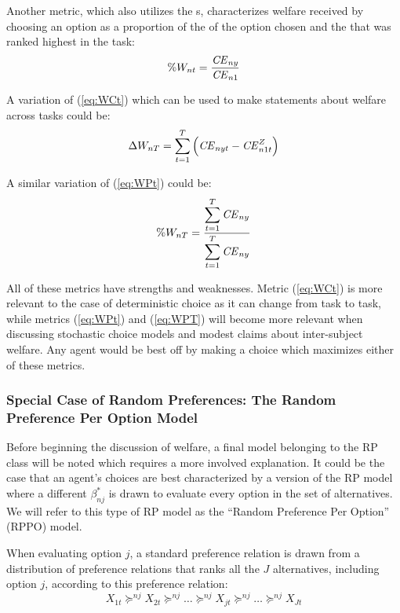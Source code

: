Another metric, which also utilizes the {\CE}s, characterizes welfare received by choosing an option as a proportion of the {\CE} of the option chosen and the {\CE} that was ranked highest in the task:
\begin{equation}
	\label{eq:WPt}
	\%W_{nt} = \frac{ {\mathit{CE}}_{ny} }{ {\mathit{CE}}_{n1} }
\end{equation}

\noindent A variation of (\ref{eq:WCt}) which can be used to make statements about welfare across tasks could be:
\begin{equation}
	\label{eq:WCT}
	\Delta W_{nT} = \sum_{t=1}^T \left( {\mathit{CE}}_{nyt} - {\mathit{CE}}_{n1t}^Z \right)
\end{equation}

\noindent A similar variation of (\ref{eq:WPt}) could be:
\begin{equation}
	\label{eq:WPT}
	\%W_{nT} = \frac{\displaystyle\sum_{t=1}^{T} {\mathit{CE}}_{ny} }{\displaystyle\sum_{t=1}^{T} {\mathit{CE}}_{ny}}
\end{equation}

All of these metrics have strengths and weaknesses.
Metric (\ref{eq:WCt}) is more relevant to the case of deterministic choice as it can change from task to task, while metrics (\ref{eq:WPt}) and (\ref{eq:WPT}) will become more relevant when discussing stochastic choice models and modest claims about inter-subject welfare.
Any agent would be best off by making a choice which maximizes either of these metrics.

\subsubsection{Special Case of Random Preferences: The Random Preference Per Option Model}

Before beginning the discussion of welfare, a final model belonging to the RP class will be noted which requires a more involved explanation.
It could be the case that an agent's choices are best characterized by a version of the RP model where a different $\beta^*_{nj}$ is drawn to evaluate every option in the set of alternatives.
We will refer to this type of RP model as the \enquote{Random Preference Per Option} (RPPO) model.

When evaluating option $j$, a standard preference relation is drawn from a distribution of preference relations that ranks all the $J$ alternatives, including option $j$, according to this preference relation:
\begin{equation}
	\label{eq:RPPO.jorank}
	X_{1t} \succcurlyeq^{nj} X_{2t} \succcurlyeq^{nj} \ldots \succcurlyeq^{nj} X_{jt} \succcurlyeq^{nj} \ldots \succcurlyeq^{nj} X_{Jt}
\end{equation}

